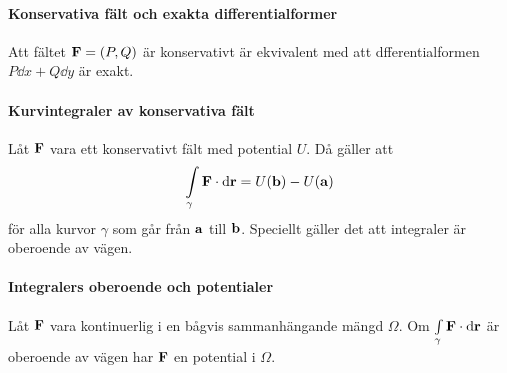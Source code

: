 \proof

\paragraph{Konservativa fält och exakta differentialformer}
Att fältet $\vect{F} = (P, Q)$ är konservativt är ekvivalent med att dfferentialformen $P\dd{x} + Q\dd{y}$ är exakt.

\proof

\paragraph{Kurvintegraler av konservativa fält}
Låt $\vect{F}$ vara ett konservativt fält med potential $U$. Då gäller att
\begin{align*}
	\cint{\gamma}{\vect{F}}{\vect{r}} = U(\vect{b}) - U(\vect{a})
\end{align*}
för alla kurvor $\gamma$ som går från $\vect{a}$ till $\vect{b}$. Speciellt gäller det att integraler är oberoende av vägen.

\proof

\paragraph{Integralers oberoende och potentialer}
Låt $\vect{F}$ vara kontinuerlig i en bågvis sammanhängande mängd $\Omega$. Om $\cint{\gamma}{\vect{F}}{\vect{r}}$ är oberoende av vägen har $\vect{F}$ en potential i $\Omega$.